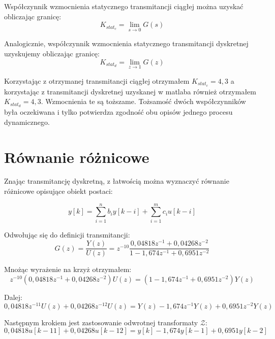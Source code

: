 \documentclass[a4paper,titlepage,11pt,floatssmall]{mwrep}
\begin{document}
\newpage

Współczynnik wzmocnienia statycznego transmitancji ciągłej można uzyskać obliczając granicę:
\begin{equation*}
K_{stat_{c}} = \lim_{s\to 0} G(s) 
\end{equation*} 

Analogicznie, współczynnik wzmocnienia statycznego transmitancji dyskretnej uzyskujemy obliczając granicę:
\begin{equation*}
K_{stat_{d}} = \lim_{z\to 1} G(z)
\end{equation*}

Korzystając z otrzymanej transmitancji ciągłej otrzymałem $K_{stat_{c}} = 4,3$ a korzystając z transmitancji dyskretnej uzyskanej w matlaba również otrzymałem $K_{stat_{d}} = 4,3$. Wzmocnienia te są toższame. Tożsamość dwóch współczynników była oczekiwana i tylko potwierdza zgodność obu opisów jednego procesu dynamicznego.

\section{Równanie różnicowe}
Znając transmitancję dyskretną, z łatwością można wyznaczyć równanie różnicowe opisujące obiekt postaci:

\begin{equation*}
y[k] = \sum_{i=1}^{n}b_{i}y[k - i] + \sum_{i=1}^{m}c_{i}u[k - i]
\end{equation*}

Odwołując się do definicji transmitancji:
\begin{equation*}
G(z) = \frac{Y(z)}{U(z)} = z^{-10}\frac{0,04818z^{-1} + 0,04268z^{-2}}{1 - 1,674z^{-1} + 0,6951z^{-2}}
\end{equation*}

Mnożąc wyrażenie na krzyż otrzymałem:
\begin{equation*}
z^{-10}(0,04818z^{-1} + 0,04268z^{-2})U(z) =  (1 - 1,674z^{-1} + 0,6951z^{-2})Y(z)
\end{equation*}

Dalej:
\begin{equation*}
0,04818z^{-11}U(z) + 0,04268z^{-12}U(z) = Y(z) - 1,674z^{-1}Y(z) + 0,6951z^{-2}Y(z)
\end{equation*}

Następnym krokiem jest zastosowanie odwrotnej transformaty $\mathcal{Z}$:
\begin{equation*}
0,04818u[k-11] + 0,04268u[k-12] = y[k] - 1,674y[k-1] + 0,6951y[k-2]
\end{equation*}
\end{document}

